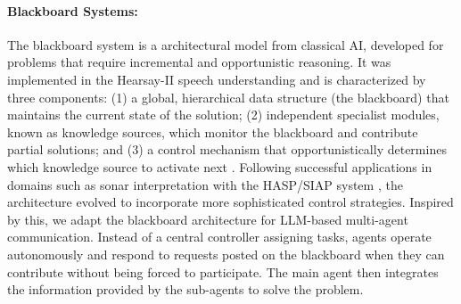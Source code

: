 \paragraph{Blackboard Systems:}

The blackboard system is a architectural model from classical AI, developed for problems that require incremental and opportunistic reasoning. It was implemented in the Hearsay-II speech understanding \citep{10.1145/356810.356816} and is characterized by three components: (1) a global, hierarchical data structure (the blackboard) that maintains the current state of the solution; (2) independent specialist modules, known as knowledge sources, which monitor the blackboard and contribute partial solutions; and (3) a control mechanism that opportunistically determines which knowledge source to activate next \citep{Nii_1986}. Following successful applications in domains such as sonar interpretation with the HASP/SIAP system \citep{Nii_Feigenbaum_Anton_1982}, the architecture evolved to incorporate more sophisticated control strategies. Inspired by this, we adapt the blackboard architecture for LLM-based multi-agent communication. Instead of a central controller assigning tasks, agents operate autonomously and respond to requests posted on the blackboard when they can contribute without being forced to participate. The main agent then integrates the information provided by the sub-agents to solve the problem.